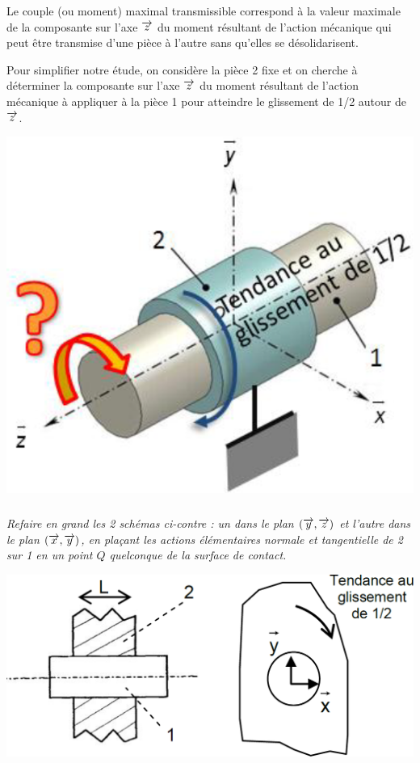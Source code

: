 \documentclass[10pt]{article}
\begin{document}
\begin{minipage}[c]{.55\linewidth}
Le couple (ou moment) maximal transmissible correspond à la valeur maximale 
de la composante sur l’axe $\overrightarrow{z}$ du moment résultant de l’action mécanique qui peut 
être transmise d’une pièce à l’autre sans qu’elles se désolidarisent. 
 
Pour simplifier notre étude, on considère la pièce 2 fixe et on cherche à 
déterminer la composante sur l’axe $\overrightarrow{z}$ du moment résultant de l’action mécanique 
à appliquer à la pièce 1 pour atteindre le glissement de 1/2 autour de $\overrightarrow{z}$.
 
\end{minipage}\hfill
\begin{minipage}[c]{.4\linewidth}
\begin{center}
\includegraphics[width=.9\textwidth]{images/fig_04}
\end{center}
\end{minipage}

\begin{minipage}[c]{.55\linewidth}
\subparagraph{}
\textit{Refaire en grand les 2 schémas ci-contre : un 
dans le plan $(\overrightarrow{y}, \overrightarrow{z})$ et l’autre dans le plan $(\overrightarrow{x}, \overrightarrow{y})$, 
en plaçant les actions élémentaires normale et 
tangentielle de 2 sur 1 en un point $Q$ 
quelconque de la surface de contact. }


\end{minipage}\hfill
\begin{minipage}[c]{.4\linewidth}
\begin{center}
\includegraphics[width=.9\textwidth]{images/fig_05}
\end{center}
\end{minipage}
\end{document}
